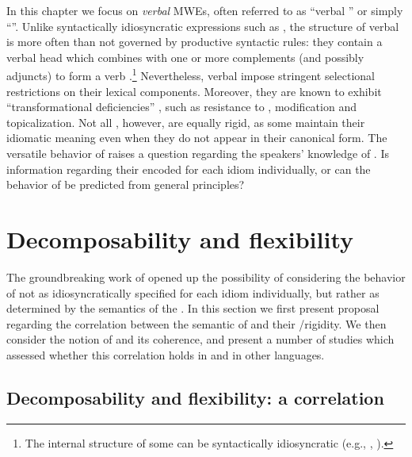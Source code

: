 \documentclass[output=paper]{langsci/langscibook}
\begin{document}
In this chapter we focus on \emph{verbal} MWEs, often referred to as ``verbal '' or simply ``''.
Unlike syntactically idiosyncratic expressions such as , the structure of verbal  is more often than not
governed by productive syntactic rules: they contain a verbal head
which combines with one or more complements (and possibly adjuncts) to
form a verb .\footnote{The internal structure of some  can be syntactically idiosyncratic (e.g., , ).}
Nevertheless, verbal  impose stringent selectional restrictions on
their lexical components. Moreover, they are known to exhibit
``transformational deficiencies'' \citep[p. 111]{chafe1968idiomaticity},
such as resistance to , modification and topicalization. Not
all , however, are equally rigid, as some maintain their idiomatic
meaning even when they do not appear in their canonical form. The versatile behavior of  raises a question regarding the
speakers' knowledge of . Is information regarding their
 encoded for each idiom individually, or can the behavior
of  be predicted from general principles?


\section{Decomposability and flexibility}
\label{she:sec:decomp}

The groundbreaking work of \citet{nunberg94} opened up the possibility
of considering the behavior of  not as idiosyncratically specified for
each idiom individually, but rather as determined by the semantics of
the . In this section we first present  proposal regarding the correlation between the semantic  of  and their /rigidity. We then consider the notion of  and its coherence, and present a number of studies which assessed whether this correlation holds in  and in other languages.


\subsection{Decomposability and flexibility: a correlation}
\end{document}
